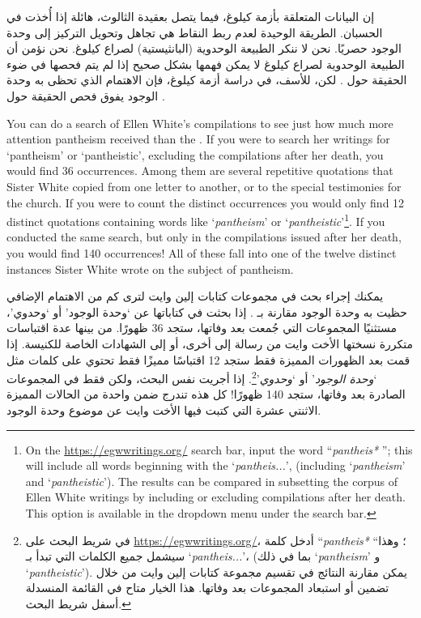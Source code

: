 إن البيانات المتعلقة بأزمة كيلوغ، فيما يتصل بعقيدة الثالوث، هائلة إذا أُخذت  في الحسبان. الطريقة الوحيدة لعدم ربط النقاط هي تجاهل  وتحويل التركيز إلى وحدة الوجود حصريًا. نحن لا ننكر الطبيعة الوحدوية (البانثيستية) لصراع كيلوغ. نحن نؤمن أن الطبيعة الوحدوية لصراع كيلوغ لا يمكن فهمها بشكل صحيح إذا لم يتم فحصها في ضوء الحقيقة حول . لكن، للأسف، في دراسة أزمة كيلوغ، فإن الاهتمام الذي تحظى به وحدة الوجود يفوق فحص الحقيقة حول .


You can do a search of Ellen White’s compilations to see just how much more attention pantheism received than the . If you were to search her writings for ‘pantheism’ or ‘pantheistic’, excluding the compilations after her death, you would find 36 occurrences. Among them are several repetitive quotations that Sister White copied from one letter to another, or to the special testimonies for the church. If you were to count the distinct occurrences you would only find 12 distinct quotations containing words like ‘\textit{pantheism}’ or ‘\textit{pantheistic}’\footnote{On the \href{https://egwwritings.org/}{https://egwwritings.org/} search bar, input the word “\textit{pantheis*} ”; this will include all words beginning with the ‘\textit{pantheis...}’, (including ‘\textit{pantheism}’ and ‘\textit{pantheistic}’). The results can be compared in subsetting the corpus of Ellen White writings by including or excluding compilations after her death. This option is available in the dropdown menu under the search bar.}. If you conducted the same search, but only in the compilations issued after her death, you would find 140 occurrences! All of these fall into one of the twelve distinct instances Sister White wrote on the subject of pantheism.


يمكنك إجراء بحث في مجموعات كتابات إلين وايت لترى كم من الاهتمام الإضافي حظيت به وحدة الوجود مقارنة بـ . إذا بحثت في كتاباتها عن ‘وحدة الوجود’ أو ‘وحدوي’، مستثنيًا المجموعات التي جُمعت بعد وفاتها، ستجد 36 ظهورًا. من بينها عدة اقتباسات متكررة نسختها الأخت وايت من رسالة إلى أخرى، أو إلى الشهادات الخاصة للكنيسة. إذا قمت بعد الظهورات المميزة فقط ستجد 12 اقتباسًا مميزًا فقط تحتوي على كلمات مثل ‘\textit{وحدة الوجود}’ أو ‘\textit{وحدوي}’\footnote{في شريط البحث على \href{https://egwwritings.org/}{https://egwwritings.org/}، أدخل كلمة “\textit{pantheis*} “؛ وهذا سيشمل جميع الكلمات التي تبدأ بـ ‘\textit{pantheis...}’، (بما في ذلك ‘\textit{pantheism}’ و ‘\textit{pantheistic}’). يمكن مقارنة النتائج في تقسيم مجموعة كتابات إلين وايت من خلال تضمين أو استبعاد المجموعات بعد وفاتها. هذا الخيار متاح في القائمة المنسدلة أسفل شريط البحث.}. إذا أجريت نفس البحث، ولكن فقط في المجموعات الصادرة بعد وفاتها، ستجد 140 ظهورًا! كل هذه تندرج ضمن واحدة من الحالات المميزة الاثنتي عشرة التي كتبت فيها الأخت وايت عن موضوع وحدة الوجود.


